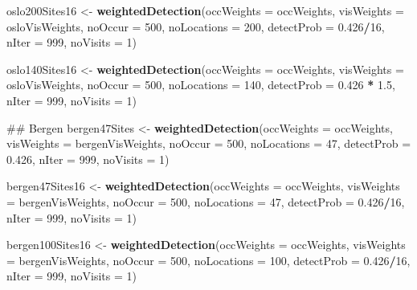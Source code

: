 \documentclass[]{article}
\newenvironment{Shaded}{\begin{snugshade}}{\end{snugshade}}
\newcommand{\KeywordTok}[1]{\textcolor[rgb]{0.13,0.29,0.53}{\textbf{#1}}}
\newcommand{\DataTypeTok}[1]{\textcolor[rgb]{0.13,0.29,0.53}{#1}}
\newcommand{\DecValTok}[1]{\textcolor[rgb]{0.00,0.00,0.81}{#1}}
\newcommand{\FloatTok}[1]{\textcolor[rgb]{0.00,0.00,0.81}{#1}}
\newcommand{\StringTok}[1]{\textcolor[rgb]{0.31,0.60,0.02}{#1}}
\newcommand{\OperatorTok}[1]{\textcolor[rgb]{0.81,0.36,0.00}{\textbf{#1}}}
\newcommand{\NormalTok}[1]{#1}
\begin{document}
\begin{Shaded}
\begin{Highlighting}[]
\NormalTok{oslo200Sites16 <-}\StringTok{ }\KeywordTok{weightedDetection}\NormalTok{(}\DataTypeTok{occWeights =}\NormalTok{ occWeights, }\DataTypeTok{visWeights =}\NormalTok{ osloVisWeights, }
    \DataTypeTok{noOccur =} \DecValTok{500}\NormalTok{, }\DataTypeTok{noLocations =} \DecValTok{200}\NormalTok{, }\DataTypeTok{detectProb =} \FloatTok{0.426}\OperatorTok{/}\DecValTok{16}\NormalTok{, }\DataTypeTok{nIter =} \DecValTok{999}\NormalTok{, }\DataTypeTok{noVisits =} \DecValTok{1}\NormalTok{)}

\NormalTok{oslo140Sites16 <-}\StringTok{ }\KeywordTok{weightedDetection}\NormalTok{(}\DataTypeTok{occWeights =}\NormalTok{ occWeights, }\DataTypeTok{visWeights =}\NormalTok{ osloVisWeights, }
    \DataTypeTok{noOccur =} \DecValTok{500}\NormalTok{, }\DataTypeTok{noLocations =} \DecValTok{140}\NormalTok{, }\DataTypeTok{detectProb =} \FloatTok{0.426} \OperatorTok{*}\StringTok{ }\FloatTok{1.5}\NormalTok{, }\DataTypeTok{nIter =} \DecValTok{999}\NormalTok{, }
    \DataTypeTok{noVisits =} \DecValTok{1}\NormalTok{)}

\NormalTok{## Bergen}
\NormalTok{bergen47Sites <-}\StringTok{ }\KeywordTok{weightedDetection}\NormalTok{(}\DataTypeTok{occWeights =}\NormalTok{ occWeights, }\DataTypeTok{visWeights =}\NormalTok{ bergenVisWeights, }
    \DataTypeTok{noOccur =} \DecValTok{500}\NormalTok{, }\DataTypeTok{noLocations =} \DecValTok{47}\NormalTok{, }\DataTypeTok{detectProb =} \FloatTok{0.426}\NormalTok{, }\DataTypeTok{nIter =} \DecValTok{999}\NormalTok{, }\DataTypeTok{noVisits =} \DecValTok{1}\NormalTok{)}

\NormalTok{bergen47Sites16 <-}\StringTok{ }\KeywordTok{weightedDetection}\NormalTok{(}\DataTypeTok{occWeights =}\NormalTok{ occWeights, }\DataTypeTok{visWeights =}\NormalTok{ bergenVisWeights, }
    \DataTypeTok{noOccur =} \DecValTok{500}\NormalTok{, }\DataTypeTok{noLocations =} \DecValTok{47}\NormalTok{, }\DataTypeTok{detectProb =} \FloatTok{0.426}\OperatorTok{/}\DecValTok{16}\NormalTok{, }\DataTypeTok{nIter =} \DecValTok{999}\NormalTok{, }\DataTypeTok{noVisits =} \DecValTok{1}\NormalTok{)}

\NormalTok{bergen100Sites16 <-}\StringTok{ }\KeywordTok{weightedDetection}\NormalTok{(}\DataTypeTok{occWeights =}\NormalTok{ occWeights, }\DataTypeTok{visWeights =}\NormalTok{ bergenVisWeights, }
    \DataTypeTok{noOccur =} \DecValTok{500}\NormalTok{, }\DataTypeTok{noLocations =} \DecValTok{100}\NormalTok{, }\DataTypeTok{detectProb =} \FloatTok{0.426}\OperatorTok{/}\DecValTok{16}\NormalTok{, }\DataTypeTok{nIter =} \DecValTok{999}\NormalTok{, }\DataTypeTok{noVisits =} \DecValTok{1}\NormalTok{)}



\end{Highlighting}
\end{Shaded}
\end{document}
